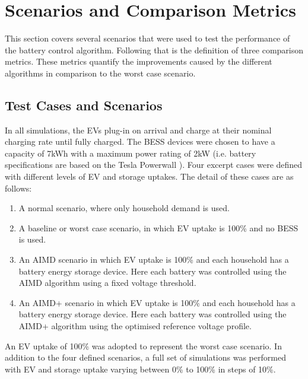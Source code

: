 \section{Scenarios and Comparison Metrics}
\label{ch4:sec:scenarios-and-comparison-metrics}

This section covers several scenarios that were used to test the performance of the battery control algorithm.
Following that is the definition of three comparison metrics.
These metrics quantify the improvements caused by the different algorithms in comparison to the worst case scenario.

\subsection{Test Cases and Scenarios}
\label{ch4:subsec:test-cases-and-scenarios}

In all simulations, the EVs plug-in on arrival and charge at their nominal charging rate until fully charged.
The BESS devices were chosen to have a capacity of 7kWh with a maximum power rating of 2kW (i.e. battery specifications are based on the Tesla Powerwall \cite{Powerwall2015}).
Four excerpt cases were defined with different levels of EV and storage uptakes.
The detail of these cases are as follows:

\begin{enumerate}[
labelindent=*,
style=multiline,
leftmargin=*,
label=\textbf{Case \Alph*}
]
\item \label{ch4:case-a}
A normal scenario, where only household demand is used.
\item \label{ch4:case-b}
A baseline or worst case scenario, in which EV uptake is 100\% and no BESS is used.
\item \label{ch4:case-c}
An AIMD scenario in which EV uptake is 100\% and each household has a battery energy storage device.
Here each battery was controlled using the AIMD algorithm using a fixed voltage threshold.
\item \label{ch4:case-d}
An AIMD+ scenario in which EV uptake is 100\% and each household has a battery energy storage device.
Here each battery was controlled using the AIMD+ algorithm using the optimised reference voltage profile.
\end{enumerate}

An EV uptake of 100\% was adopted to represent the worst case scenario.
In addition to the four defined scenarios, a full set of simulations was performed with EV and storage uptake varying between 0\% to 100\% in steps of 10\%.

